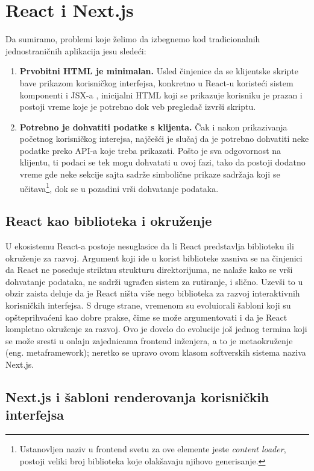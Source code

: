 \documentclass[12pt,oneside]{memoir}
\begin{document}
\section{React i Next.js}
Da sumiramo, problemi koje želimo da izbegnemo kod tradicionalnih jednostraničnih aplikacija jesu sledeći:
\begin{enumerate}
    \item \textbf{Prvobitni HTML je minimalan.} Usled činjenice da se klijentske skripte bave prikazom korisničkog interfejsa, konkretno u React-u koristeći sistem komponenti i JSX-a \cite{reactdocscomponents}, inicijalni HTML koji se prikazuje korisniku je prazan i postoji vreme koje je potrebno dok veb pregledač izvrši skriptu.
    \item \textbf{Potrebno je dohvatiti podatke s klijenta.} Čak i nakon prikazivanja početnog korisničkog interejsa, najčešći je slučaj da je potrebno dohvatiti neke podatke preko API-a koje treba prikazati. Pošto je sva odgovornost na klijentu, ti podaci se tek mogu dohvatati u ovoj fazi, tako da postoji dodatno vreme gde neke sekcije sajta sadrže simbolične prikaze sadržaja koji se učitava\footnote{Ustanovljen naziv u frontend svetu za ove elemente jeste \textit{content loader}, postoji veliki broj biblioteka koje olakšavaju njihovo generisanje.}, dok se u pozadini vrši dohvatanje podataka.
\end{enumerate}

\subsection{React kao biblioteka i okruženje}

U ekosistemu React-a postoje nesuglasice da li React predstavlja biblioteku ili okruženje za razvoj. Argument koji ide u korist biblioteke zasniva se na činjenici da React ne poseduje striktnu strukturu direktorijuma, ne nalaže kako se vrši dohvatanje podataka, ne sadrži ugrađen sistem za rutiranje, i slično. Uzevši to u obzir zaista deluje da je React ništa više nego biblioteka za razvoj interaktivnih korisničkih interfejsa. S druge strane, vremenom su evoluiorali šabloni koji su opšteprihvaćeni kao dobre prakse, čime se može argumentovati i da je React kompletno okruženje za razvoj. Ovo je dovelo do evolucije još jednog termina koji se može sresti u onlajn zajednicama frontend inženjera, a to je metaokruženje (eng. metaframework); neretko se upravo ovom klasom softverskih sistema naziva Next.js.

\subsection{Next.js i šabloni renderovanja korisničkih interfejsa}
\end{document}
